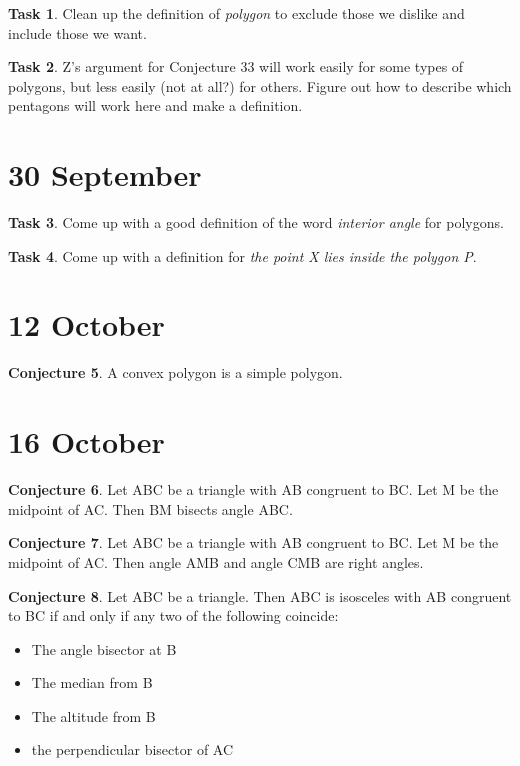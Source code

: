 \documentclass{amsart}
\theoremstyle{definition}
\newtheorem{conjecture}{Conjecture}
\newtheorem{task}[conjecture]{Task}
\begin{document}
\begin{task} 
Clean up the definition of \emph{polygon} to exclude those we
dislike and include those we want.
\end{task}

\begin{task} Z's argument for Conjecture 33 will work easily for some types of polygons, but less easily (not at all?) for others. Figure out how to describe which pentagons will work here and make a definition.
\end{task}

\section*{30 September}

\begin{task} Come up with a good definition of the word 
\emph{interior angle} for polygons.
\end{task}

\begin{task} Come up with a definition for \emph{the point X lies inside the polygon P}.
\end{task}

\section*{12 October}

\begin{conjecture} 
A convex polygon is a simple polygon.
\end{conjecture}

\section*{16 October}

\begin{conjecture} 
Let ABC be a triangle with AB congruent to BC. Let
M be the midpoint of AC. Then BM bisects angle ABC.
\end{conjecture}

\begin{conjecture} Let ABC be a triangle with AB congruent to BC. Let M be the midpoint of AC. Then angle AMB and angle CMB are right angles.
\end{conjecture}


\begin{conjecture} Let ABC be a triangle. Then ABC is isosceles with
 AB congruent to BC if and only if any two of the following coincide:
\begin{itemize}
\item The angle bisector at B
\item The median from B
\item The altitude from B
\item the perpendicular bisector of AC
\end{itemize}
\end{conjecture}
\end{document}
